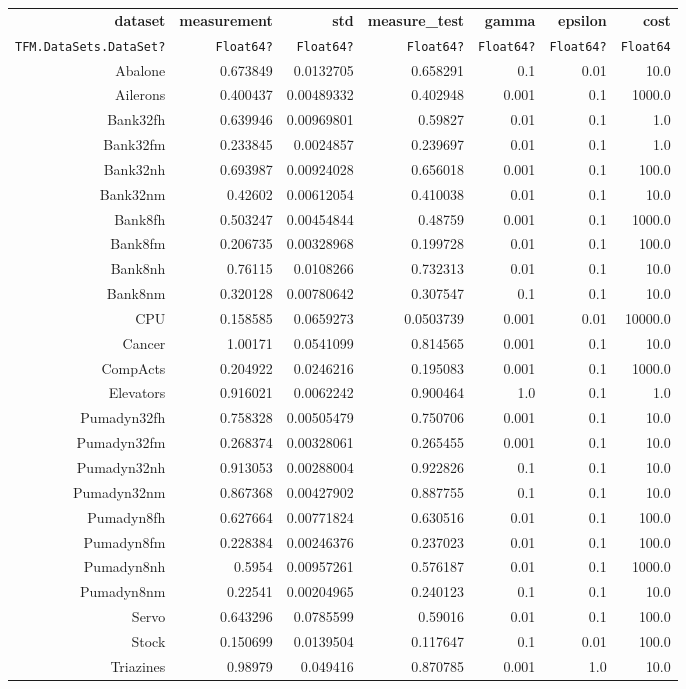 \begin{tabular}{rrrrrrr}
  \toprule
  \textbf{dataset} & \textbf{measurement} & \textbf{std} & \textbf{measure\_test} & \textbf{gamma} & \textbf{epsilon} & \textbf{cost} \\
  \texttt{TFM.DataSets.DataSet?} & \texttt{Float64?} & \texttt{Float64?} & \texttt{Float64?} & \texttt{Float64?} & \texttt{Float64?} & \texttt{Float64} \\\midrule
  Abalone & 0.673849 & 0.0132705 & 0.658291 & 0.1 & 0.01 & 10.0 \\
  Ailerons & 0.400437 & 0.00489332 & 0.402948 & 0.001 & 0.1 & 1000.0 \\
  Bank32fh & 0.639946 & 0.00969801 & 0.59827 & 0.01 & 0.1 & 1.0 \\
  Bank32fm & 0.233845 & 0.0024857 & 0.239697 & 0.01 & 0.1 & 1.0 \\
  Bank32nh & 0.693987 & 0.00924028 & 0.656018 & 0.001 & 0.1 & 100.0 \\
  Bank32nm & 0.42602 & 0.00612054 & 0.410038 & 0.01 & 0.1 & 10.0 \\
  Bank8fh & 0.503247 & 0.00454844 & 0.48759 & 0.001 & 0.1 & 1000.0 \\
  Bank8fm & 0.206735 & 0.00328968 & 0.199728 & 0.01 & 0.1 & 100.0 \\
  Bank8nh & 0.76115 & 0.0108266 & 0.732313 & 0.01 & 0.1 & 10.0 \\
  Bank8nm & 0.320128 & 0.00780642 & 0.307547 & 0.1 & 0.1 & 10.0 \\
  CPU & 0.158585 & 0.0659273 & 0.0503739 & 0.001 & 0.01 & 10000.0 \\
  Cancer & 1.00171 & 0.0541099 & 0.814565 & 0.001 & 0.1 & 10.0 \\
  CompActs & 0.204922 & 0.0246216 & 0.195083 & 0.001 & 0.1 & 1000.0 \\
  Elevators & 0.916021 & 0.0062242 & 0.900464 & 1.0 & 0.1 & 1.0 \\
  Pumadyn32fh & 0.758328 & 0.00505479 & 0.750706 & 0.001 & 0.1 & 10.0 \\
  Pumadyn32fm & 0.268374 & 0.00328061 & 0.265455 & 0.001 & 0.1 & 10.0 \\
  Pumadyn32nh & 0.913053 & 0.00288004 & 0.922826 & 0.1 & 0.1 & 10.0 \\
  Pumadyn32nm & 0.867368 & 0.00427902 & 0.887755 & 0.1 & 0.1 & 10.0 \\
  Pumadyn8fh & 0.627664 & 0.00771824 & 0.630516 & 0.01 & 0.1 & 100.0 \\
  Pumadyn8fm & 0.228384 & 0.00246376 & 0.237023 & 0.01 & 0.1 & 100.0 \\
  Pumadyn8nh & 0.5954 & 0.00957261 & 0.576187 & 0.01 & 0.1 & 1000.0 \\
  Pumadyn8nm & 0.22541 & 0.00204965 & 0.240123 & 0.1 & 0.1 & 10.0 \\
  Servo & 0.643296 & 0.0785599 & 0.59016 & 0.01 & 0.1 & 100.0 \\
  Stock & 0.150699 & 0.0139504 & 0.117647 & 0.1 & 0.01 & 100.0 \\
  Triazines & 0.98979 & 0.049416 & 0.870785 & 0.001 & 1.0 & 10.0 \\\bottomrule
\end{tabular}
